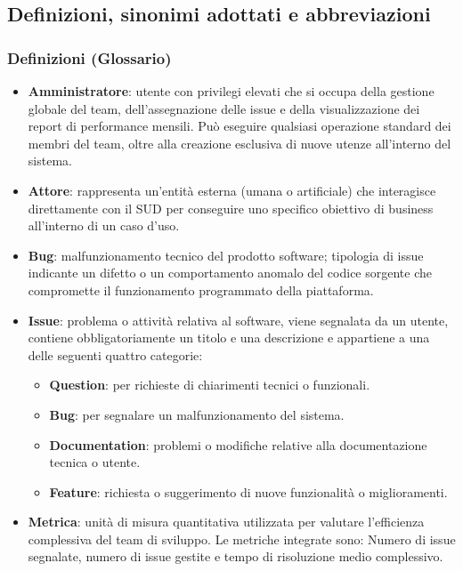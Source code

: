 \documentclass[a4paper,12pt]{article}
\begin{document}
\subsection{Definizioni, sinonimi adottati e abbreviazioni}
\subsubsection{Definizioni (Glossario)}
\begin{itemize}
    \item \textbf{Amministratore}: utente con privilegi elevati che si occupa della gestione globale del team, dell'assegnazione delle issue e della visualizzazione dei report di performance mensili. Può eseguire qualsiasi operazione standard dei membri del team, oltre alla creazione esclusiva di nuove utenze all'interno del sistema.
    
    \item \textbf{Attore}: rappresenta un'entità esterna (umana o artificiale) che interagisce direttamente con il SUD per conseguire uno specifico obiettivo di business all'interno di un caso d'uso.

    \item \textbf{Bug}: malfunzionamento tecnico del prodotto software; tipologia di issue indicante un difetto o un comportamento anomalo del codice sorgente che compromette il funzionamento programmato della piattaforma.

    \item \textbf{Issue}: problema o attività relativa al software, viene segnalata da un utente, contiene obbligatoriamente un titolo e una descrizione e appartiene a una delle seguenti quattro categorie:
    \begin{itemize}
        \item \textbf{Question}: per richieste di chiarimenti tecnici o funzionali.
        \item \textbf{Bug}: per segnalare un malfunzionamento del sistema.
        \item \textbf{Documentation}: problemi o modifiche relative alla documentazione tecnica o utente.
        \item \textbf{Feature}: richiesta o suggerimento di nuove funzionalità o miglioramenti.
    \end{itemize}

    \item \textbf{Metrica}: unità di misura quantitativa utilizzata per valutare l'efficienza complessiva del team di sviluppo. Le metriche integrate sono: Numero di issue segnalate, numero di issue gestite e tempo di risoluzione medio complessivo.


\end{itemize}
\end{document}
